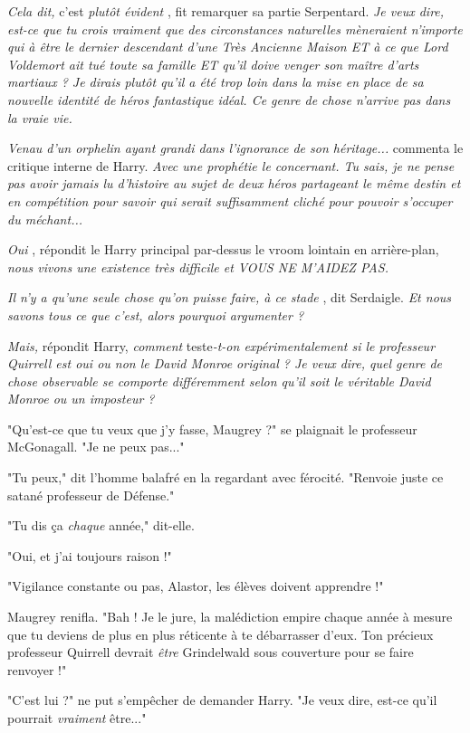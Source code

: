 \emph{Cela dit, } c'est \emph{plutôt évident} , fit remarquer sa partie Serpentard. \emph{Je veux dire, est-ce que tu crois vraiment que des circonstances naturelles mèneraient n'importe qui à être le dernier descendant d'une Très Ancienne Maison ET à ce que Lord Voldemort ait tué toute sa famille ET qu'il doive venger son maître d'arts martiaux ? Je dirais plutôt qu'il a été trop loin dans la mise en place de sa nouvelle identité de héros fantastique idéal. Ce genre de chose n'arrive pas dans la vraie vie.} 

\emph{Venau d'un orphelin ayant grandi dans l'ignorance de son héritage...}  commenta le critique interne de Harry. \emph{Avec une prophétie le concernant. Tu sais, je ne pense pas avoir jamais lu d'histoire au sujet de deux héros partageant le même destin et en compétition pour savoir qui serait suffisamment cliché pour pouvoir s'occuper du méchant...} 

\emph{Oui} , répondit le Harry principal par-dessus le vroom lointain en arrière-plan, \emph{nous vivons une existence très difficile et VOUS NE M'AIDEZ PAS.} 

\emph{Il n'y a qu'une seule chose qu'on puisse faire, à ce stade} , dit Serdaigle. \emph{Et nous savons tous ce que c'est, alors pourquoi argumenter ?} 

\emph{Mais,}  répondit Harry, \emph{comment } teste\emph{-t-on expérimentalement si le professeur Quirrell est oui ou non le David Monroe original ? Je veux dire, quel genre de chose observable se comporte différemment selon qu'il soit le véritable David Monroe ou un imposteur ?} 

"Qu'est-ce que tu veux que j'y fasse, Maugrey ?" se plaignait le professeur McGonagall. "Je ne peux pas..."

"Tu peux," dit l'homme balafré en la regardant avec férocité. "Renvoie juste ce satané professeur de Défense."

"Tu dis ça \emph{chaque } année," dit-elle.

"Oui, et j'ai toujours raison !"

"Vigilance constante ou pas, Alastor, les élèves doivent apprendre !"

Maugrey renifla. "Bah ! Je le jure, la malédiction empire chaque année à mesure que tu deviens de plus en plus réticente à te débarrasser d'eux. Ton précieux professeur Quirrell devrait \emph{être}  Grindelwald sous couverture pour se faire renvoyer !"

"C'est lui ?" ne put s'empêcher de demander Harry. "Je veux dire, est-ce qu'il pourrait \emph{vraiment}  être..."

